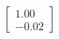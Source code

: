 \documentclass[preview]{standalone}
\begin{document}
\begin{align*}
\begin{bmatrix} 1.00 \\ -0.02 \end{bmatrix}
\end{align*}
\end{document}
